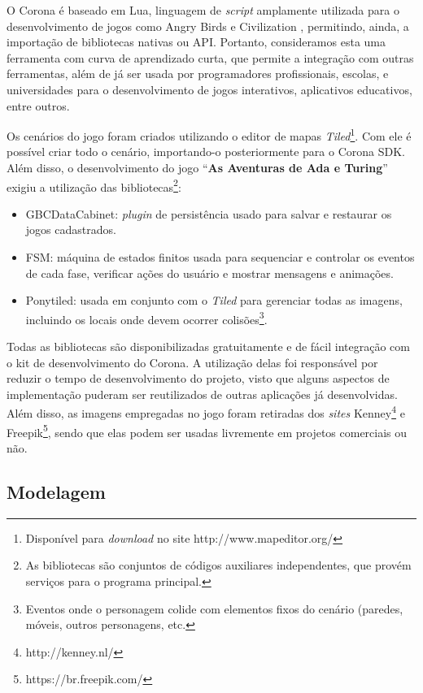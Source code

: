 O Corona é baseado em Lua, linguagem de \textit{script} amplamente utilizada para o desenvolvimento de jogos como Angry Birds \texttrademark e Civilization \texttrademark, permitindo, ainda, a importação de bibliotecas nativas ou \acrshort{API}. Portanto, consideramos esta uma ferramenta com curva de aprendizado curta, que permite a integração com outras ferramentas, além de já ser usada por programadores profissionais, escolas, e universidades para o desenvolvimento de jogos interativos, aplicativos educativos, entre outros.

Os cenários do jogo foram criados utilizando o editor de mapas \textit{Tiled}\footnote{Disponível para \textit{download} no site http://www.mapeditor.org/}. Com ele é possível criar todo o cenário, importando-o posteriormente para o Corona SDK. Além disso, o desenvolvimento do jogo “\textbf{As Aventuras de Ada e Turing}” exigiu a utilização das bibliotecas\footnote{As bibliotecas são conjuntos de códigos auxiliares independentes, que provém serviços para o programa principal.}:

\begin{itemize}
	\item GBCDataCabinet: \textit{plugin} de persistência usado para salvar e restaurar os jogos cadastrados.
	\item FSM: máquina de estados finitos usada para sequenciar e controlar os eventos de cada fase, verificar ações do usuário e mostrar mensagens e animações.
	\item Ponytiled: usada em conjunto com o \textit{Tiled} para gerenciar todas as imagens, incluindo os locais onde devem ocorrer colisões\footnote{Eventos onde o personagem colide com elementos fixos do cenário (paredes, móveis, outros personagens, etc.}. 
\end{itemize}

Todas as bibliotecas são disponibilizadas gratuitamente e de fácil integração com o kit de desenvolvimento do Corona. A utilização delas foi responsável por reduzir o tempo de desenvolvimento do projeto, visto que alguns aspectos de implementação puderam ser reutilizados de outras aplicações já desenvolvidas. Além disso, as imagens empregadas no jogo foram retiradas dos \textit{sites} Kenney\footnote{http://kenney.nl/} e Freepik\footnote{https://br.freepik.com/}, sendo que elas podem ser usadas livremente em projetos comerciais ou não.

\subsection{Modelagem} \label{ssec:modelagem}

